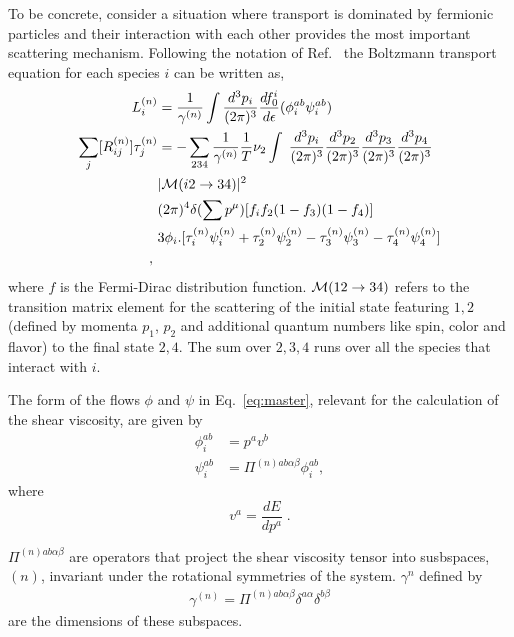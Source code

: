 \documentclass[10pt, aps, prd, superscriptaddress, nofootinbib, 
               amsmath, amssymb, twocolumn,
               preprintnumbers, showpacs,
               raggedbottom,
               floatfix]{revtex4-1}
\newcommand{\dthree}[1]{\frac{d^3#1}{(2\pi)^3}}
\newcommand{\deltafour}{(2\pi)^4\delta(\sum p^\mu)}
\newcommand{\calM}{{\cal{M}}}
\begin{document}
To be concrete, consider a situation where transport is dominated by fermionic
particles and their interaction with each other provides the most important
scattering mechanism. Following the notation of Ref.~\cite{Alford:2014doa} the Boltzmann
transport equation for each species $i$ can be written as,
\begin{equation}
\begin{split}
L_i^{(n)} &= 
\frac{1}{\gamma^{(n)}} \int \frac{d^3p_i}{(2\pi)^3} \frac{df_0^i}{d\epsilon}
(\phi_i^{ab}\psi_i^{ab})\\
\sum_j [R^{(n)}_{ij}]\tau^{(n)}_j&=-\sum_{234} \frac{1}{\gamma^{(n)}}\frac{1}{T}\nu_2 \int\;
\dthree{p_i}\dthree{p_2}\dthree{p_3}\dthree{p_4}\\
&
|\calM(i2\rightarrow34)|^2\\
&
\deltafour
[f_if_2(1-f_3)(1-f_4)]\\
&3\phi_i.[\tau^{(n)}_i\psi_i^{(n)}
+\tau^{(n)}_2\psi_2^{(n)}
-\tau^{(n)}_3\psi_3^{(n)}
-\tau^{(n)}_4\psi_4^{(n)}]\\
\;,~\label{eq:master}
\end{split}
\end{equation}
where $f$ is the Fermi-Dirac distribution function. ${\cal{M}}(12\rightarrow
34)$ refers to the transition matrix element for the scattering of the initial
state featuring $1, 2$ (defined by momenta $p_1$, $p_2$ and additional quantum
numbers like spin, color and flavor) to the final state $2,4$. The sum over $2,
3, 4$ runs over all the species that interact with $i$.  

The form of the flows $\phi$ and $\psi$ in Eq.~\ref{eq:master}, relevant for
the calculation of the shear viscosity, are given by
\begin{equation}
\begin{split}
\phi_i^{ab}&=p^av^b\;\\
\psi_i^{ab}&=\Pi^{(n)ab\alpha\beta}\phi_i^{ab}, 
\end{split}
\end{equation}
where
\begin{equation}
v^a = \frac{d E}{dp^a}\;.
\end{equation}


$\Pi^{(n)ab\alpha\beta}$ are operators that project the shear
viscosity tensor into susbspaces, $(n)$, invariant under the rotational 
symmetries of the system. $\gamma^{n}$ defined
by
\begin{equation}
\begin{split}
\gamma^{(n)} =  \Pi^{(n)ab\alpha\beta}\delta^{a\alpha}\delta^{b\beta}
\end{split}
\end{equation}
are the dimensions of these subspaces.
\end{document}
